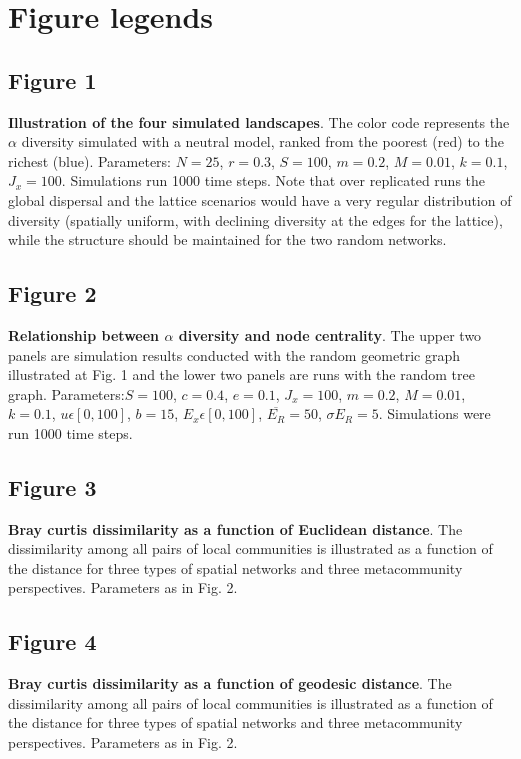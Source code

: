 \documentclass[12pt]{article}
\begin{document}
\printbibliography

\newpage
\section*{Figure legends}

\subsection*{Figure 1}
\textbf{Illustration of the four simulated landscapes}. The color code
represents the $\alpha$ diversity simulated with a neutral model, ranked from
the poorest (red) to the richest (blue). Parameters: $N = 25$, $r = 0.3 $, $S =
100$, $m = 0.2$, $M = 0.01$, $k = 0.1$, $J_x = 100$. Simulations run 1000 time
steps. Note that over replicated runs the global dispersal and the lattice scenarios would have a very regular distribution of diversity (spatially uniform, with declining diversity at the edges for the lattice), while the structure should be maintained for the two random networks. 

\subsection*{Figure 2}
\textbf{Relationship between $\alpha$ diversity and node centrality}. The upper
two panels are simulation results conducted with the random geometric graph
illustrated at Fig. 1 and the lower two panels are runs with the random tree
graph. Parameters:$S = 100$, $c = 0.4$, $e = 0.1$, $J_x = 100$, $m = 0.2$, $M =
0.01$, $k = 0.1$, $ u \epsilon [0,100]$, $b = 15$, $ E_x \epsilon [0,100]$,
$\overline{E_R} = 50$, $\sigma{E_R} = 5$. Simulations were run 1000 time steps.

\subsection*{Figure 3}
\textbf{Bray curtis dissimilarity as a function of Euclidean distance}. The dissimilarity among all pairs of local communities is illustrated as a function of the distance for three types of spatial networks and three metacommunity perspectives. Parameters as in Fig. 2.

\subsection*{Figure 4}
\textbf{Bray curtis dissimilarity as a function of geodesic distance}. The dissimilarity among all pairs of local communities is illustrated as a function of the distance for three types of spatial networks and three metacommunity perspectives. Parameters as in Fig. 2.
\end{document}

